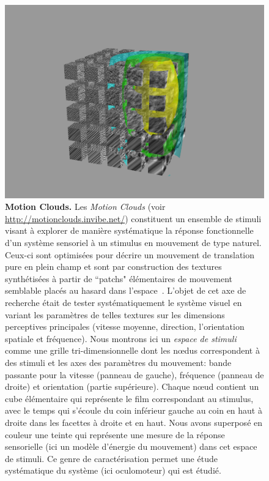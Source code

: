 \documentclass[11pt,french,a4paper,oneside]{article}%
\begin{document}
\begin{figure}%
\centerline{\includegraphics[width=.9\linewidth]{MCartwork.png}}
\caption{\textbf{Motion Clouds.} Les \emph{Motion Clouds}  (voir \url{http://motionclouds.invibe.net/}) constituent un ensemble de stimuli visant à explorer de manière systématique la réponse fonctionnelle d'un système sensoriel à un stimulus en mouvement de type naturel. Ceux-ci sont optimisées pour décrire un mouvement de translation pure en plein champ et sont par construction des textures synthétisées à partir de ``patchs" élémentaires de mouvement semblable placés au hasard dans l'espace~\citep{Sanz12,Vacher15nips}. L'objet de cet axe de recherche était de tester systématiquement le système visuel en variant les paramètres de telles textures sur les dimensions perceptives principales (vitesse moyenne, direction, l'orientation spatiale et fréquence). Nous montrons ici un \emph{espace de stimuli} comme une grille tri-dimensionnelle dont les n\oe dus correspondent à des stimuli et les axes des paramètres du mouvement: bande passante pour la vitesse (panneau de gauche), fréquence (panneau de droite) et orientation (partie supérieure). Chaque n\oe ud contient un cube élémentaire qui représente le film correspondant au stimulus, avec le temps qui s'écoule du coin inférieur gauche au coin en haut à droite dans les facettes à droite et en haut. Nous avons superposé en couleur une teinte qui représente une mesure de la réponse sensorielle (ici un modèle d'énergie du mouvement) dans cet espace de stimuli. Ce genre de caractérisation permet une étude systématique du système (ici oculomoteur) qui est étudié.
 }%
\label{fig:motionclouds}%
\end{figure}%
\end{document}
